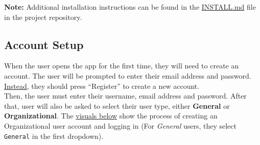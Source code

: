 \documentclass[12pt, titlepage]{article}
\begin{document}
\textbf{Note:} Additional installation instructions can be found in the \href{https://github.com/russellrd/realm/blob/main/INSTALL.md}{INSTALL.md} file in the project repository.

\subsection{Account Setup}
When the user opens the app for the first time, they will need to create an account. The user will be prompted to enter their email address and password. \hyperref[fig:setup1]{Instead}, they should press ``Register'' to create a new account. \\
Then, the user must enter their username, email address and password. After that, user will also be asked to select their user type, either \textbf{General} or \textbf{Organizational}. The \hyperref[fig:setup1]{visuals below} show the process of creating an Organizational user account and logging in (For \emph{General} users, they select \texttt{General} in the first dropdown).
\end{document}
